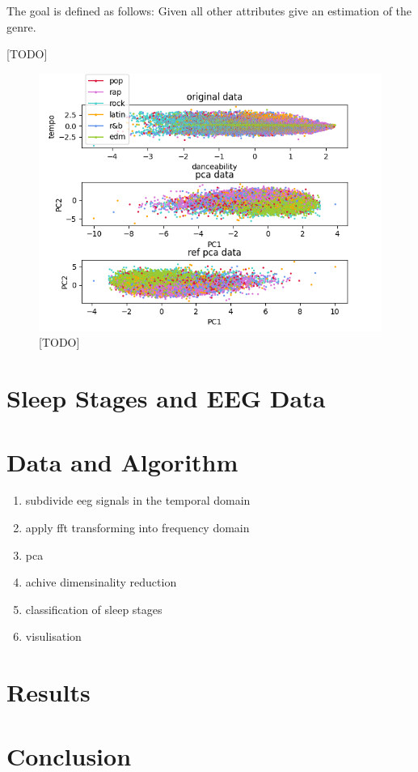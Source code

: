 \documentclass[a4paper]{IEEEtran}
\begin{document}
The goal is defined as follows: Given all other attributes give an estimation of the genre.

[TODO]

\begin{figure}
	\centering
	\includegraphics[width=1\linewidth]{figs/songs}
	\caption{[TODO]}
	\label{fig:songs}
\end{figure}


\section{Sleep Stages and EEG Data}
\label{sec:sleep_stages_and_eeg_data}

\section{Data and Algorithm}
\label{sec:data_and_algorithm}

\begin{enumerate}
	\item subdivide eeg signals in the temporal domain
	\item apply fft transforming into frequency domain
	\item pca
	\item achive dimensinality reduction
	\item classification of sleep stages
	\item visulisation
\end{enumerate}

\section{Results}
\label{sec:results}

\section{Conclusion}
\label{sec:conclusion}



\end{document}
